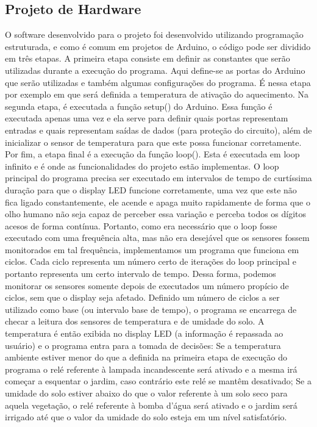\documentclass[a4paper,12pt]{article}
\begin{document}
\subsection{Projeto de Hardware}
O software desenvolvido para o projeto foi desenvolvido utilizando programação estruturada, e como é comum em projetos de Arduino, o código pode ser dividido em três etapas. A primeira etapa consiste em definir as constantes que serão utilizadas durante a execução do programa. Aqui define-se as portas do Arduino que serão utilizadas e também algumas configurações do programa. É nessa etapa por exemplo em que será definida a temperatura de ativação do aquecimento. Na segunda etapa, é executada a função setup() do Arduino. Essa função é executada apenas uma vez e ela serve para definir quais portas representam entradas e quais representam saídas de dados (para proteção do circuito), além de inicializar o sensor de temperatura para que este possa funcionar corretamente. Por fim, a etapa final é a execução da função loop(). Esta é executada em loop infinito e é onde as funcionalidades do projeto estão implementas.
    O loop principal do programa precisa ser executado em intervalos de tempo de curtíssima duração para que o display LED funcione corretamente, uma vez que este não fica ligado constantemente, ele acende e apaga muito rapidamente de forma que o olho humano não seja capaz de perceber essa variação e perceba todos os dígitos acesos de forma contínua. Portanto, como era necessário que o loop fosse executado com uma frequência alta, mas não era desejável que os sensores fossem monitorados em tal frequência, implementamos um programa que funciona em ciclos. Cada ciclo representa um número certo de iterações do loop principal e portanto representa um certo intervalo de tempo. Dessa forma, podemos monitorar os sensores somente depois de executados um número propício de ciclos, sem que o display seja afetado.
    Definido um número de ciclos a ser utilizado como base (ou intervalo base de tempo), o programa se encarrega de checar a leitura dos sensores de temperatura e de umidade do solo. A temperatura é então exibida no display LED (a informação é repassada ao usuário) e o programa entra para a tomada de decisões: Se a temperatura ambiente estiver menor do que a definida na primeira etapa de execução do programa o relé referente à lampada incandescente será ativado e a mesma irá começar a esquentar o jardim, caso contrário este relé se mantêm desativado; Se a umidade do solo estiver abaixo do que o valor referente à um solo seco para aquela vegetação, o relé referente à bomba d’água será ativado e o jardim será irrigado até que o valor da umidade do solo esteja em um nível satisfatório.
\end{document}
